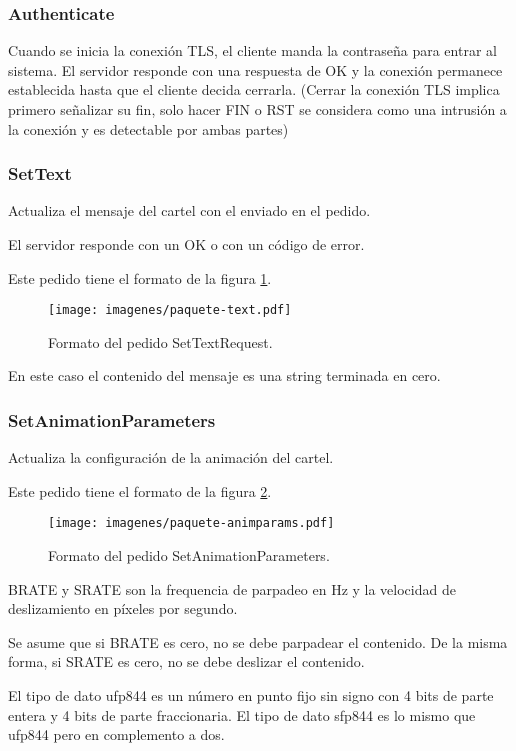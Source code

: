 \subsubsection{Authenticate}
Cuando se inicia la conexión TLS, el cliente manda la contraseña para entrar al sistema. El servidor responde con una respuesta de OK y la conexión permanece establecida hasta que el cliente decida cerrarla. (Cerrar la conexión TLS implica primero señalizar su fin, solo hacer FIN o RST se considera como una intrusión a la conexión y es detectable por ambas partes)

\subsubsection{SetText}
Actualiza el mensaje del cartel con el enviado en el pedido.

El servidor responde con un OK o con un código de error.

Este pedido tiene el formato de la figura \ref{fig:paquete-text}.
\begin{figure}[h]
	\centering
	\label{fig:paquete-text}
	\texttt{[image: imagenes/paquete-text.pdf]}
		\caption{Formato del pedido SetTextRequest.}
\end{figure}

En este caso el contenido del mensaje es una string terminada en cero.

\subsubsection{SetAnimationParameters}
Actualiza la configuración de la animación del cartel.

Este pedido tiene el formato de la figura \ref{fig:paquete-animparams}.
\begin{figure}[h]
	\centering
	\label{fig:paquete-animparams}
	\texttt{[image: imagenes/paquete-animparams.pdf]}
		\caption{Formato del pedido SetAnimationParameters.}
\end{figure}

BRATE y SRATE son la frequencia de parpadeo en Hz y la velocidad de deslizamiento en píxeles por segundo.

Se asume que si BRATE es cero, no se debe parpadear el contenido. De la misma forma, si SRATE es cero, no se debe deslizar el contenido.

El tipo de dato ufp844 es un número en punto fijo sin signo con 4 bits de parte entera y 4 bits de parte fraccionaria. El tipo de dato sfp844 es lo mismo que ufp844 pero en complemento a dos.

